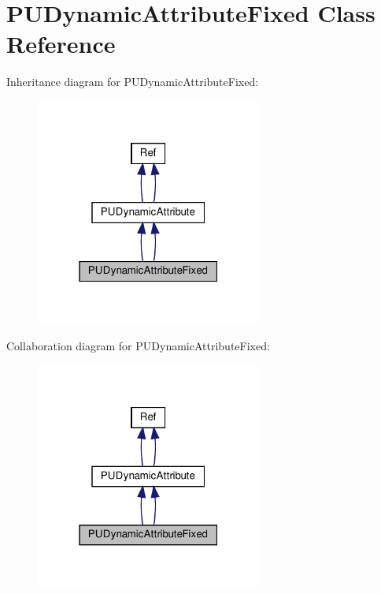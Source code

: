\hypertarget{classPUDynamicAttributeFixed}{}\section{P\+U\+Dynamic\+Attribute\+Fixed Class Reference}
\label{classPUDynamicAttributeFixed}


Inheritance diagram for P\+U\+Dynamic\+Attribute\+Fixed\+:
\nopagebreak
\begin{figure}[H]
\begin{center}
\leavevmode
\includegraphics[width=211pt]{classPUDynamicAttributeFixed__inherit__graph}
\end{center}
\end{figure}


Collaboration diagram for P\+U\+Dynamic\+Attribute\+Fixed\+:
\nopagebreak
\begin{figure}[H]
\begin{center}
\leavevmode
\includegraphics[width=211pt]{classPUDynamicAttributeFixed__coll__graph}
\end{center}
\end{figure}

